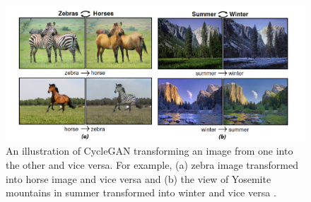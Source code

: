 \begin{figure}[H]
        \begin{center}
 	    \includegraphics[scale=0.35]{images/relatedWorks/CycleGANExamples.png}
	    \caption[An illustration of \ac{CycleGAN} transforming an image from one into the other and vice versa.]{An illustration of \ac{CycleGAN} transforming an image from one into the other and vice versa. For example, (a) zebra image transformed into horse image and vice versa and (b) the view of Yosemite mountains in summer transformed into winter and vice versa \cite{zhu2020unpaired}.}
	    \label{fig:CycleganExamples}
	    \end{center}
\end{figure}


